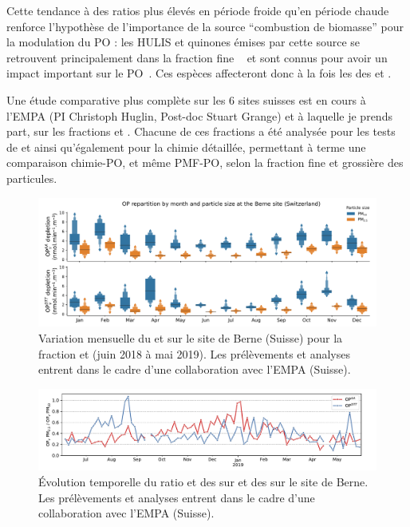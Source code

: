 Cette tendance à des ratios plus élevés en période froide qu'en période chaude renforce
l'hypothèse de l'importance de la source ``combustion de biomasse'' pour la modulation du
PO : les HULIS et quinones émises par cette source se retrouvent principalement dans la
fraction fine \PMdc{}~\autocite{linAbundance2010,fangOxidative2019} et sont connus pour
avoir un impact important sur le PO~\autocite{vermaFractionating2015,maSources2018}.
Ces espèces affecteront donc à la fois les \POv{} des \PMdc{} et \PMdix.

Une étude comparative plus complète sur les 6 sites suisses est en cours à l'EMPA (PI
Christoph Huglin, Post-doc Stuart Grange) et à laquelle je prends part, sur les fractions
\PMdix{} et \PMdc. Chacune de ces fractions a été analysée pour les tests de \POAA{} et
\PODTT{} ainsi qu'également pour la chimie détaillée, permettant à terme une comparaison
chimie-PO, et même PMF-PO, selon la fraction fine et grossière des particules.

\begin{figure}[ht]
    \centering
    \includegraphics[width=1.0\linewidth]{figures/chapter04/PO_berne.pdf}
    \caption{Variation mensuelle du \POAAv{} et \PODTTv{} sur le site de Berne (Suisse)
    pour la fraction \PMdix{} et \PMdc{} (juin 2018 à mai 2019).  Les prélèvements et
analyses entrent dans le cadre d'une collaboration avec l'EMPA (Suisse).}%
    \label{fig:PO_berne}
\end{figure}

\begin{figure}[ht]
    \centering
    \includegraphics[width=1\linewidth]{figures/chapter04/PO_berne_ratio_PM10_PM25.pdf}
    \caption{Évolution temporelle du ratio \POAAv{} et \PODTTv{} des \PMdix{} sur \POAAv{}
    et \PODTTv{} des \PMdc{} sur le site de Berne. Les prélèvements et
analyses entrent dans le cadre d'une collaboration avec l'EMPA (Suisse).}%
    \label{fig:PO_berne_ratio_PM10_PM25}
\end{figure}

